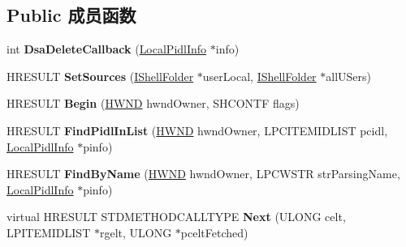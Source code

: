 \subsection*{Public 成员函数}
\begin{DoxyCompactItemize}
\item 
\mbox{\label{class_c_enum_merged_folder_acdbe3cbb416a5ae3cd6feca490096f40}} 
int {\bfseries Dsa\+Delete\+Callback} (\hyperlink{struct_local_pidl_info}{Local\+Pidl\+Info} $\ast$info)
\item 
\mbox{\label{class_c_enum_merged_folder_a61f6c4069475365b6dbfe72ed679f570}} 
H\+R\+E\+S\+U\+LT {\bfseries Set\+Sources} (\hyperlink{interface_i_shell_folder}{I\+Shell\+Folder} $\ast$user\+Local, \hyperlink{interface_i_shell_folder}{I\+Shell\+Folder} $\ast$all\+U\+Sers)
\item 
\mbox{\label{class_c_enum_merged_folder_a59c54a2d697bbbbc8c3a5c899ea1c92d}} 
H\+R\+E\+S\+U\+LT {\bfseries Begin} (\hyperlink{interfacevoid}{H\+W\+ND} hwnd\+Owner, S\+H\+C\+O\+N\+TF flags)
\item 
\mbox{\label{class_c_enum_merged_folder_ae128b91647a37dc463cbaab248619875}} 
H\+R\+E\+S\+U\+LT {\bfseries Find\+Pidl\+In\+List} (\hyperlink{interfacevoid}{H\+W\+ND} hwnd\+Owner, L\+P\+C\+I\+T\+E\+M\+I\+D\+L\+I\+ST pcidl, \hyperlink{struct_local_pidl_info}{Local\+Pidl\+Info} $\ast$pinfo)
\item 
\mbox{\label{class_c_enum_merged_folder_a41d572bbf45c2fbfddb499000c83fb82}} 
H\+R\+E\+S\+U\+LT {\bfseries Find\+By\+Name} (\hyperlink{interfacevoid}{H\+W\+ND} hwnd\+Owner, L\+P\+C\+W\+S\+TR str\+Parsing\+Name, \hyperlink{struct_local_pidl_info}{Local\+Pidl\+Info} $\ast$pinfo)
\item 
\mbox{\label{class_c_enum_merged_folder_a76303d237b03399575673dcdfe83b343}} 
virtual H\+R\+E\+S\+U\+LT S\+T\+D\+M\+E\+T\+H\+O\+D\+C\+A\+L\+L\+T\+Y\+PE {\bfseries Next} (U\+L\+O\+NG celt, L\+P\+I\+T\+E\+M\+I\+D\+L\+I\+ST $\ast$rgelt, U\+L\+O\+NG $\ast$pcelt\+Fetched)
\item 
\mbox{\label{class_c_enum_merged_folder_af8b0c0866e299c953d06ae52f33de8ec}} 

\end{DoxyCompactItemize}
